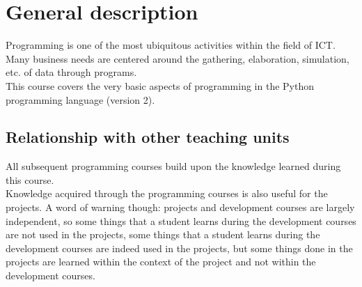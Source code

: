 \section{General description}
		Programming is one of the most ubiquitous activities within the field of ICT. Many business needs are centered around the gathering, elaboration, simulation, etc. of data through programs. \\
		
		This course covers the very basic aspects of programming in the Python programming language (version 2). \\

	\subsection{Relationship with other teaching units}
		All subsequent programming courses build upon the knowledge learned during this course.	\\
		
		Knowledge acquired through the programming courses is also useful for the projects. A word of warning though: projects and development courses are largely independent, so some things that a student learns during the development courses are not used in the projects, some things that a student learns during the development courses are indeed used in the projects, but some things done in the projects are learned within the context of the project and not within the development courses.
